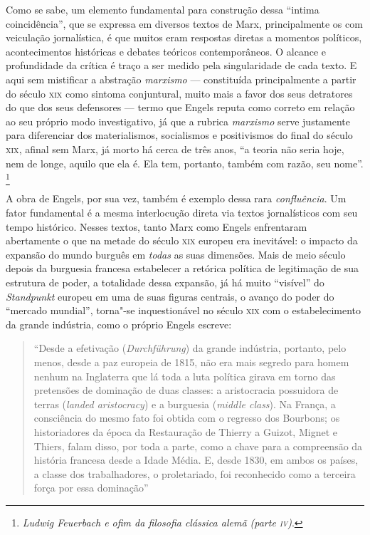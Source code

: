Como se sabe, um elemento fundamental para construção dessa ``intima
coincidência'', que se expressa em diversos textos de Marx,
principalmente os com veiculação jornalística, é que muitos eram
respostas diretas a momentos políticos, acontecimentos históricas e
debates teóricos contemporâneos. O alcance e profundidade da crítica é
traço a ser medido pela singularidade de cada texto. E aqui sem
mistificar a abstração \emph{marxismo} --- constituída principalmente a
partir do século \textsc{xix} como sintoma conjuntural, muito mais a favor dos
seus detratores do que dos seus defensores --- termo que Engels reputa
como correto em relação ao seu próprio modo investigativo, já que a
rubrica \emph{marxismo} serve justamente para diferenciar dos
materialismos, socialismos e positivismos do final do século \textsc{xix}, afinal
sem Marx, já morto há cerca de três anos, ``a teoria não seria hoje, nem
de longe, aquilo que ela é. Ela tem, portanto, também com razão, seu
nome''. \footnote{\emph{Ludwig Feuerbach e ofim da filosofia clássica
  alemã (parte \textsc{iv})}.}

A obra de Engels, por sua vez, também é exemplo dessa rara
\emph{confluência}. Um fator fundamental é a mesma interlocução direta
via textos jornalísticos com seu tempo histórico. Nesses textos, tanto
Marx como Engels enfrentaram abertamente o que na metade do século \textsc{xix}
europeu era inevitável: o impacto da expansão do mundo burguês em
\emph{todas} as suas dimensões. Mais de meio século depois da burguesia
francesa estabelecer a retórica política de legitimação de sua estrutura
de poder, a totalidade dessa expansão, já há muito ``visível'' do
\emph{Standpunkt} europeu em uma de suas figuras centrais, o avanço do
poder do ``mercado mundial'', torna"-se inquestionável no século \textsc{xix} com
o estabelecimento da grande indústria, como o próprio Engels escreve:

\begin{quote}
``Desde a efetivação (\emph{Durchführung}) da grande indústria,
portanto, pelo menos, desde a paz europeia de 1815, não era mais segredo
para homem nenhum na Inglaterra que lá toda a luta política girava em
torno das pretensões de dominação de duas classes: a aristocracia
possuidora de terras (\emph{landed aristocracy}) e a burguesia (\emph{middle
class}). Na França, a consciência do mesmo
fato foi obtida com o regresso dos Bourbons; os historiadores da época
da Restauração de Thierry a Guizot, Mignet e Thiers,
falam disso, por toda a parte, como a chave para a compreensão da
história francesa desde a Idade Média. E, desde 1830, em ambos os
países, a classe dos trabalhadores, o proletariado, foi reconhecido como
a terceira força por essa dominação''
\end{quote}

